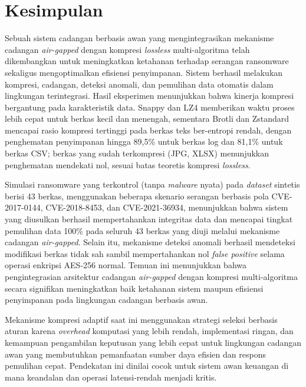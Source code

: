 \documentclass{iaesarticle}
\begin{document}
\section{Kesimpulan}
\label{sec:kesimpulan}
Sebuah sistem cadangan berbasis awan yang mengintegrasikan mekanisme cadangan \textit{air-gapped} dengan kompresi \textit{lossless} multi-algoritma telah dikembangkan untuk meningkatkan ketahanan terhadap serangan ransomware sekaligus mengoptimalkan efisiensi penyimpanan. Sistem berhasil melakukan kompresi, cadangan, deteksi anomali, dan pemulihan data otomatis dalam lingkungan terintegrasi. Hasil eksperimen menunjukkan bahwa kinerja kompresi bergantung pada karakteristik data. Snappy dan LZ4 memberikan waktu proses lebih cepat untuk berkas kecil dan menengah, sementara Brotli dan Zstandard mencapai rasio kompresi tertinggi pada berkas teks ber-entropi rendah, dengan penghematan penyimpanan hingga 89,5\% untuk berkas log dan 81,1\% untuk berkas CSV; berkas yang sudah terkompresi (JPG, XLSX) menunjukkan penghematan mendekati nol, sesuai batas teoretis kompresi \textit{lossless}.

Simulasi ransomware yang terkontrol (tanpa \textit{malware} nyata) pada \textit{dataset} sintetis berisi 43 berkas, menggunakan beberapa skenario serangan berbasis pola CVE-2017-0144, CVE-2018-8453, dan CVE-2021-36934, menunjukkan bahwa sistem yang diusulkan berhasil mempertahankan integritas data dan mencapai tingkat pemulihan data 100\% pada seluruh 43 berkas yang diuji melalui mekanisme cadangan \textit{air-gapped}. Selain itu, mekanisme deteksi anomali berhasil mendeteksi modifikasi berkas tidak sah sambil mempertahankan nol \textit{false positive} selama operasi enkripsi AES-256 normal. Temuan ini menunjukkan bahwa pengintegrasian arsitektur cadangan \textit{air-gapped} dengan kompresi multi-algoritma secara signifikan meningkatkan baik ketahanan sistem maupun efisiensi penyimpanan pada lingkungan cadangan berbasis awan.

Mekanisme kompresi adaptif saat ini menggunakan strategi seleksi berbasis aturan karena \textit{overhead} komputasi yang lebih rendah, implementasi ringan, dan kemampuan pengambilan keputusan yang lebih cepat untuk lingkungan cadangan awan yang membutuhkan pemanfaatan sumber daya efisien dan respons pemulihan cepat. Pendekatan ini dinilai cocok untuk sistem awan keuangan di mana keandalan dan operasi latensi-rendah menjadi kritis.
\end{document}

